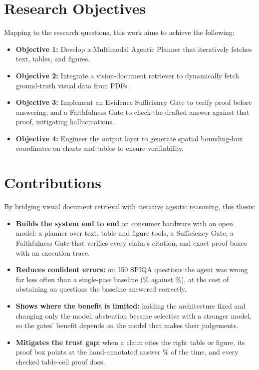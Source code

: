 \section{Research Objectives}
Mapping to the research questions, this work aims to achieve the following:
\begin{itemize}
    \item \textbf{Objective 1:} Develop a Multimodal Agentic Planner that iteratively fetches text, tables, and figures.
    \item \textbf{Objective 2:} Integrate a vision-document retriever to dynamically fetch ground-truth visual data from PDFs.
    \item \textbf{Objective 3:} Implement an Evidence Sufficiency Gate to verify proof before answering, and a Faithfulness Gate to check the drafted answer against that proof, mitigating hallucinations.
    \item \textbf{Objective 4:} Engineer the output layer to generate spatial bounding-box coordinates on charts and tables to ensure verifiability.
\end{itemize}

\section{Contributions}
By bridging visual document retrieval with iterative agentic reasoning, this thesis:
\begin{itemize}
    \item \textbf{Builds the system end to end} on consumer hardware with an open model: a planner over text, table and figure tools, a Sufficiency Gate, a Faithfulness Gate that verifies every claim's citation, and exact proof boxes with an execution trace.
    \item \textbf{Reduces confident errors:} on 150 SPIQA questions the agent was wrong far less often than a single-pass baseline (\nFullWrong\% against \nSPWrong\%), at the cost of abstaining on questions the baseline answered correctly.
    \item \textbf{Shows where the benefit is limited:} holding the architecture fixed and changing only the model, abstention became selective with a stronger model, so the gates' benefit depends on the model that makes their judgements.
    \item \textbf{Mitigates the trust gap:} when a claim cites the right table or figure, its proof box points at the hand-annotated answer \nProofInsideFull\% of the time, and every checked table-cell proof does.
\end{itemize}